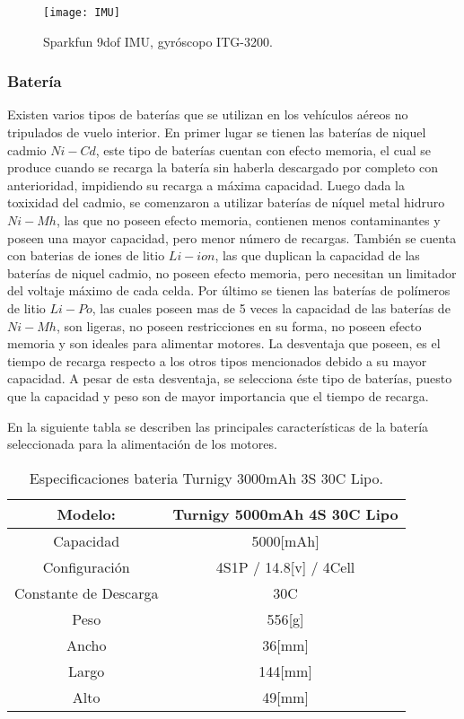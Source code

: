 \documentclass[\main/main.tex]{subfiles}
\begin{document}
\begin{figure}[H]
\noindent \begin{centering}
\texttt{[image: IMU]}
\par\end{centering}
\caption{Sparkfun 9dof IMU, gyróscopo ITG-3200.}
\end{figure}

\textcompwordmark{}

\subsubsection{Batería}

Existen varios tipos de baterías que se utilizan en los vehículos
aéreos no tripulados de vuelo interior. En primer lugar se tienen
las baterías de niquel cadmio $Ni-Cd$, este tipo de baterías cuentan
con efecto memoria, el cual se produce cuando se recarga la batería
sin haberla descargado por completo con anterioridad, impidiendo su
recarga a máxima capacidad. Luego dada la toxixidad del cadmio, se
comenzaron a utilizar baterías de níquel metal hidruro $Ni-Mh$, las
que no poseen efecto memoria, contienen menos contaminantes y poseen
una mayor capacidad, pero menor número de recargas. También se cuenta
con baterias de iones de litio $Li-ion$, las que duplican la capacidad
de las baterías de niquel cadmio, no poseen efecto memoria, pero necesitan
un limitador del voltaje máximo de cada celda. Por último se tienen
las baterías de polímeros de litio $Li-Po$, las cuales poseen mas
de 5 veces la capacidad de las baterías de $Ni-Mh$, son ligeras,
no poseen restricciones en su forma, no poseen efecto memoria y son
ideales para alimentar motores. La desventaja que poseen, es el tiempo
de recarga respecto a los otros tipos mencionados debido a su mayor
capacidad. A pesar de esta desventaja, se selecciona éste tipo de
baterías, puesto que la capacidad y peso son de mayor importancia
que el tiempo de recarga.

En la siguiente tabla se describen las principales características
de la batería seleccionada para la alimentación de los motores.

\begin{table}[H]
\noindent \begin{centering}
\begin{tabular}{|c|c|}
\hline 
\multicolumn{1}{|c}{Modelo:} & Turnigy 5000mAh 4S 30C Lipo\tabularnewline
\hline 
\hline 
Capacidad  & 5000{[}mAh{]}\tabularnewline
\hline 
Configuración & 4S1P / 14.8{[}v{]} / 4Cell\tabularnewline
\hline 
Constante de Descarga & 30C\tabularnewline
\hline 
Peso & 556{[}g{]}\tabularnewline
\hline 
Ancho & 36{[}mm{]}\tabularnewline
\hline 
Largo & 144{[}mm{]}\tabularnewline
\hline 
Alto & 49{[}mm{]}\tabularnewline
\hline 
\end{tabular}
\par\end{centering}
\caption{Especificaciones bateria Turnigy 3000mAh 3S 30C Lipo.}
\end{table}
\end{document}
